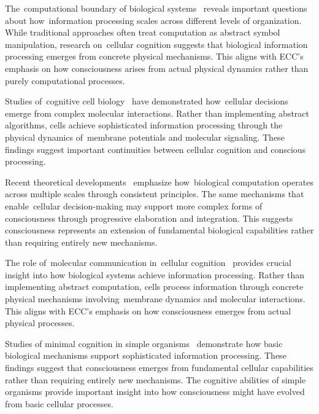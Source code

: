 The~computational boundary of biological systems~\cite{Levin2019, akhlaghpour2022rna} reveals important questions about how~information processing scales across different levels of organization. While traditional approaches often treat computation as abstract symbol manipulation, research on~cellular cognition suggests that biological information processing emerges from concrete physical mechanisms. This aligns with ECC's emphasis on how consciousness arises from actual physical dynamics rather than purely computational processes.

Studies of~cognitive cell biology~\cite{Mitchell2016, Manicka2019} have demonstrated how~cellular decisions emerge from complex molecular interactions. Rather than implementing abstract algorithms, cells achieve sophisticated information processing through the physical dynamics of~membrane potentials and molecular signaling. These findings suggest important continuities between cellular cognition and conscious processing.

Recent theoretical developments~\cite{Fields2020, juarrero2023context} emphasize how~biological computation operates across multiple scales through consistent principles. The same mechanisms that enable~cellular decision-making may support more complex forms of consciousness through progressive elaboration and integration. This suggests consciousness represents an extension of fundamental biological capabilities rather than requiring entirely new mechanisms.

The role of~molecular communication in~cellular cognition~\cite{Manicka2019, gershman2023molecular} provides crucial insight into how biological systems achieve information processing. Rather than implementing abstract computation, cells process information through concrete physical mechanisms involving~membrane dynamics and molecular interactions. This aligns with ECC's emphasis on how consciousness emerges from actual physical processes.

Studies of minimal cognition in simple organisms~\cite{vanDuijn2006, lyon2021reframing} demonstrate how basic biological mechanisms support sophisticated information processing. These findings suggest that consciousness emerges from fundamental cellular capabilities rather than requiring entirely new mechanisms. The cognitive abilities of simple organisms provide important insight into how consciousness might have evolved from basic cellular processes.

